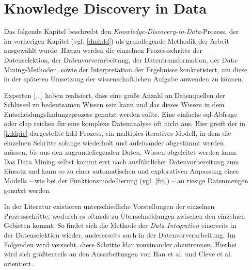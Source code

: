 \section{Knowledge Discovery in Data}
\label{kdd}

Das folgende Kapitel beschreibt den \textit{Knowledge-Discovery-in-Data}-Prozess, der im vorherigen Kapitel (vgl. \vref{dmkdd}) als grundlegende Methodik der Arbeit ausgewählt wurde. Hierzu werden die einzelnen Prozessschritte der Datenselektion, der Datenvorverarbeitung, der Datentransformation, der Data-Mining-Methoden, sowie der Interpretation der Ergebnisse konkretisiert, um diese in der späteren Umsetzung der wissenschaftlichen Aufgabe anwenden zu können.

\glqq Experten [...] haben realisiert, dass eine große Anzahl an Datenquellen der Schlüssel zu bedeutsamen Wissen sein kann und das dieses Wissen in dem Entscheidungsfindungsprozess genutzt werden sollte. Eine einfache \gls{sql}-Abfrage oder \gls{olap} reichen für eine komplexe Datenanalyse oft nicht aus.\grqq{} Hier greift der in \vref{kddpic} dargestellte \gls{kdd}-Prozess, ein multiples iteratives Modell, in dem die einzelnen Schritte solange wiederholt und aufeinander abgestimmt werden müssen, bis aus den zugrundeliegenden Daten, Wissen abgeleitet werden kann. Das Data Mining selbst kommt erst nach ausführlicher Datenvorbereitung zum Einsatz und kann so zu einer automatischen und explorativen Anpassung eines Modells -- wie bei der Funktionsmodellierung (vgl. \vref{fm}) -- an riesige Datenmengen genutzt werden.

In der Literatur existieren unterschiedliche Vorstellungen der einzelnen Prozessschritte, wodurch es oftmals zu Überschneidungen zwischen den einzelnen Gebieten kommt. So findet sich die Methode der \textit{Data Integration} einerseits in der Datenselektion wieder, andererseits auch in der Datenvorverarbeitung. Im Folgenden wird versucht, diese Schritte klar voneinander abzutrennen. Hierbei wird sich größtenteils an den Ausarbeitungen von Han et al. und Cleve et al. orientiert.


